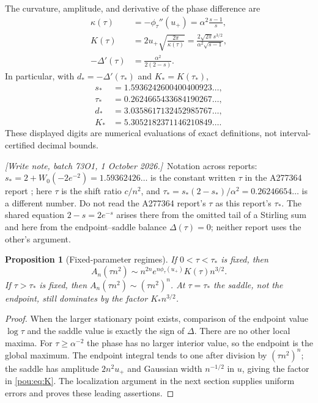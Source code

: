 \documentclass[11pt]{article}
\newtheorem{proposition}[theorem]{Proposition}
\theoremstyle{definition}
\theoremstyle{remark}
\newcommand{\writenote}[1]{\par\smallskip\noindent
 \textit{[Write note, batch 73O1, 1 October 2026.]}\ #1\par\smallskip}
\begin{document}
The curvature, amplitude, and derivative of the phase difference are
\begin{align}
 \kappa(\tau)&=-\phi_\tau''(u_+)
        =\alpha^2\frac{s-1}{s},\label{pou:eq:kap}\\
 K(\tau)&=2u_+\sqrt{\frac{2\pi}{\kappa(\tau)}}
        =\frac{2\sqrt{2\pi}s^{3/2}}{\alpha^2\sqrt{s-1}},\label{pou:eq:K}\\
 -\Delta'(\tau)&=\frac{\alpha^2}{2(2-s)}.\label{pou:eq:deltaprime}
\end{align}
In particular, with $d_*=-\Delta'(\tau_*)$ and $K_*=K(\tau_*)$,
\begin{align*}
 s_*&=1.5936242600400400923\ldots,\\
 \tau_*&=0.2624665433684190267\ldots,\\
 d_*&=3.0358617132452985767\ldots,\\
 K_*&=5.3052182371146210849\ldots.
\end{align*}
These displayed digits are numerical evaluations of exact definitions,
not interval-certified decimal bounds.

\writenote{Notation across reports: $s_*=2+W_0(-2e^{-2})=1.59362426\ldots$
is the constant written $\tau$ in the A277364 report \cite{bellreport};
here $\tau$ is the shift ratio $c/n^2$, and
$\tau_*=s_*(2-s_*)/\alpha^2=0.26246654\ldots$ is a different number. Do
not read the A277364 report's $\tau$ as this report's $\tau_*$. The
shared equation $2-s=2e^{-s}$ arises there from the omitted tail of a
Stirling sum and here from the endpoint--saddle balance $\Delta(\tau)=0$; neither
report uses the other's argument.}

\begin{proposition}[Fixed-parameter regimes]\label{pou:prop:fixedregimes}
If $0<\tau<\tau_*$ is fixed, then
\[
 A_n(\tau n^2)\sim n^{2n}e^{n\phi_\tau(u_+)}K(\tau)n^{3/2}.
\]
If $\tau>\tau_*$ is fixed, then
$A_n(\tau n^2)\sim(\tau n^2)^n$.
At $\tau=\tau_*$ the saddle, not the endpoint, still dominates by the
factor $K_*n^{3/2}$.
\end{proposition}
\begin{proof}
When the larger stationary point exists, comparison of the endpoint value
$\log\tau$ and the saddle value is exactly the sign of $\Delta$.
There are no other local maxima.  For $\tau\ge\alpha^{-2}$ the phase has
no larger interior value, so the endpoint is the global maximum.
The endpoint integral tends to one after division by $(\tau n^2)^n$;
the saddle has amplitude $2n^2u_+$ and Gaussian width $n^{-1/2}$ in $u$,
giving the factor in \eqref{pou:eq:K}.  The localization argument in the next
section supplies uniform errors and proves these leading assertions.
\end{proof}
\end{document}
